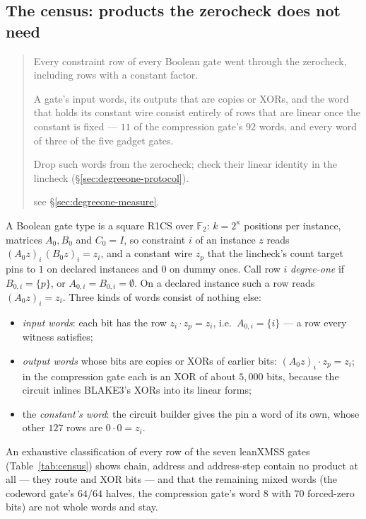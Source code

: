 \documentclass[11pt]{article}
\newcommand{\Ftwo}{\mathbb{F}_2}
\newenvironment{optsummary}{%
  \begin{quote}\small
  \begin{description}
  \setlength{\itemsep}{1pt}\setlength{\parsep}{0pt}\setlength{\topsep}{2pt}
}{%
  \end{description}
  \end{quote}
}
\begin{document}
\subsection{The census: products the zerocheck does not need}\label{sec:census}

\begin{optsummary}
\item[Baseline:] Every constraint row of every Boolean gate went through the zerocheck, including rows with a constant factor.
\item[Observation:] A gate's input words, its outputs that are copies or XORs, and the word that holds its constant wire consist entirely of rows that are linear once the constant is fixed --- $11$ of the compression gate's $92$ words, and every word of three of the five gadget gates.
\item[Mechanism:] Drop such words from the zerocheck; check their linear identity in the lincheck (\S\ref{sec:degreeone-protocol}).
\item[Result:] see \S\ref{sec:degreeone-measure}.
\end{optsummary}

A Boolean gate type is a square R1CS over $\Ftwo$: $k = 2^\kappa$
positions per instance, matrices $A_0, B_0$ and $C_0 = I$, so constraint
$i$ of an instance $z$ reads $(A_0 z)_i\,(B_0 z)_i = z_i$, and a constant
wire $z_p$ that the lincheck's count target pins to $1$ on declared
instances and $0$ on dummy ones. Call row $i$ \emph{degree-one} if
$B_{0,i} = \{p\}$, or $A_{0,i} = B_{0,i} = \emptyset$. On a declared
instance such a row reads $(A_0 z)_i = z_i$. Three kinds of words consist
of nothing else:
\begin{itemize}
\setlength{\itemsep}{1pt}
\item \emph{input words}: each bit has the row $z_i\cdot z_p = z_i$, i.e.\ $A_{0,i} = \{i\}$ --- a row every witness satisfies;
\item \emph{output words} whose bits are copies or XORs of earlier bits: $(A_0z)_i\cdot z_p = z_i$; in the compression gate each is an XOR of about $5{,}000$ bits, because the circuit inlines BLAKE3's XORs into its linear forms;
\item the \emph{constant's word}: the circuit builder gives the pin a word of its own, whose other $127$ rows are $0\cdot 0 = z_i$.
\end{itemize}
An exhaustive classification of every row of the seven leanXMSS gates
(Table~\ref{tab:census}) shows chain, address and address-step contain
no product at all --- they route and XOR bits --- and that the remaining
mixed words (the codeword gate's $64/64$ halves, the compression gate's
word $8$ with $70$ forced-zero bits) are not whole words and stay.
\end{document}

